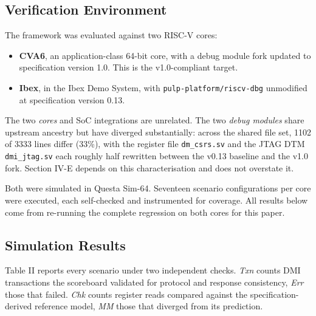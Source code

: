 \documentclass[conference]{IEEEtran}
\begin{document}
\subsection{Verification Environment}
The framework was evaluated against two RISC-V cores:

\begin{itemize}
\item \textbf{CVA6}, an application-class 64-bit core, with a debug module fork updated to specification version 1.0. This is the v1.0-compliant target.
\item \textbf{Ibex}, in the Ibex Demo System, with \texttt{pulp-platform/riscv-dbg} unmodified at specification version 0.13.
\end{itemize}

The two \textit{cores} and SoC integrations are unrelated. The two \textit{debug modules} share upstream ancestry but have diverged substantially: across the shared file set, 1102 of 3333 lines differ (33\%), with the register file \texttt{dm\_csrs.sv} and the JTAG DTM \texttt{dmi\_jtag.sv} each roughly half rewritten between the v0.13 baseline and the v1.0 fork. Section IV-E depends on this characterisation and does not overstate it.

Both were simulated in Questa Sim-64. Seventeen scenario configurations per core were executed, each self-checked and instrumented for coverage. All results below come from re-running the complete regression on both cores for this paper.

\subsection{Simulation Results}
Table II reports every scenario under two independent checks. \textit{Txn} counts DMI transactions the scoreboard validated for protocol and response consistency, \textit{Err} those that failed. \textit{Chk} counts register reads compared against the specification-derived reference model, \textit{MM} those that diverged from its prediction.
\end{document}
